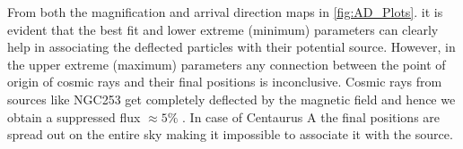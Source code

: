 \documentclass[usenatbib]{mnras}
\begin{document}
From both the magnification and arrival direction maps in \ref{fig:AD_Plots}. it is evident that the best fit and lower extreme (minimum) parameters can clearly help in associating the deflected particles with their potential source. However, in the upper extreme (maximum) parameters any connection between the point of origin of cosmic rays and their final positions is inconclusive. Cosmic rays from  sources like NGC253 get completely deflected by the magnetic field and hence we obtain a suppressed flux $\approx 5\%$ . In case of Centaurus A the final positions are spread out on the entire sky making it impossible to associate it with the source.








\end{document}
